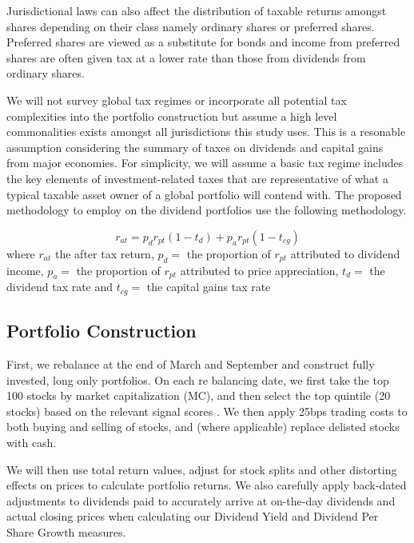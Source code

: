 \documentclass[11pt,preprint, authoryear]{elsarticle}
\numberwithin{equation}{section}
\numberwithin{figure}{section}
\numberwithin{table}{section}
\begin{document}
Jurisdictional laws can also affect the distribution of taxable returns
amongst shares depending on their class namely ordinary shares or
preferred shares. Preferred shares are viewed as a substitute for bonds
and income from preferred shares are often given tax at a lower rate
than those from dividends from ordinary shares.

We will not survey global tax regimes or incorporate all potential tax
complexities into the portfolio construction but assume a high level
commonalities exists amongst all jurisdictions this study uses. This is
a resonable assumption considering the summary of taxes on dividends and
capital gains from major economies. For simplicity, we will assume a
basic tax regime includes the key elements of investment-related taxes
that are representative of what a typical taxable asset owner of a
global portfolio will contend with. The proposed methodology to employ
on the dividend portfolios use the following methodology.

\[
r_{a t}=p_d r_{p t}\left(1-t_d\right)+p_a r_{p t}\left(1-t_{c g}\right)
\] where \(r_{a t}\) the after tax return, \(p_d=\) the proportion of
\(r_{p t}\) attributed to dividend income, \(p_a=\) the proportion of
\(r_{p t}\) attributed to price appreciation, \(t_d=\) the dividend tax
rate and \(t_{c g}=\) the capital gains tax rate

\newpage

\hypertarget{portfolio-construction}{%
\subsection{Portfolio Construction}\label{portfolio-construction}}

First, we rebalance at the end of March and September and construct
fully invested, long only portfolios. On each re balancing date, we
first take the top 100 stocks by market capitalization (MC), and then
select the top quintile (20 stocks) based on the relevant signal scores
. We then apply 25bps trading costs to both buying and selling of
stocks, and (where applicable) replace delisted stocks with cash.

We will then use total return values, adjust for stock splits and other
distorting effects on prices to calculate portfolio returns. We also
carefully apply back-dated adjustments to dividends paid to accurately
arrive at on-the-day dividends and actual closing prices when
calculating our Dividend Yield and Dividend Per Share Growth measures.
\end{document}

